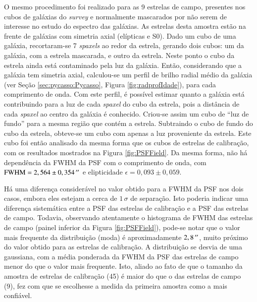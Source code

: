 O mesmo procedimento foi realizado para as 9 estrelas de campo, presentes nos
cubos de galáxias do {\em survey} e normalmente mascarados por não serem de
interesse no estudo do espectro das galáxias. As estrelas desta amostra estão na
frente de galáxias com simetria axial (elípticas e S0). Dado um cubo de uma
galáxia, recortaram-se 7 {\em spaxels} ao redor da estrela, gerando dois cubos:
um da galáxia, com a estrela mascarada, e outro da estrela. Neste ponto o cubo da
estrela ainda está contaminado pela luz da galáxia. Então, considerando que a
galáxia tem simetria axial, calculou-se um perfil de brilho radial médio da
galáxia (ver Seção \ref{sec:pycasso:Pycasso}, Figura \ref{fig:radprofIdade}),
para cada comprimento de onda. Com este perfil, é possível estimar quanto a
galáxia está contribuindo para a luz de cada {\em spaxel} do cubo da estrela,
pois a distância de cada {\em spaxel} ao centro da galáxia é conhecido. Criou-se
assim um cubo de ``luz de fundo'' para a mesma região que contém a estrela.
Subtraindo o cubo de fundo do cubo da estrela, obteve-se um cubo com apenas a
luz proveniente da estrela. Este cubo foi então analisado da mesma forma que os
cubos de estrelas de calibração, com os resultados mostrados na Figura
\ref{fig:PSFField}. Da mesma forma, não há dependência da FWHM da PSF com o
comprimento de onda, com $\mathrm{FWHM}=2,564 \pm 0,354\,^{\prime\prime}$ e elipticidade
$\epsilon=0,093 \pm 0,059$.


Há uma diferença considerável no valor obtido para a FWHM da PSF nos dois casos,
embora eles estejam a cerca de $1\,\sigma$ de separação. Isto poderia indicar
uma diferença sistemática entre a PSF das estrelas de calibração e a PSF das
estrelas de campo. Todavia, observando atentamente o histograma de FWHM das
estrelas de campo (painel inferior da Figura \ref{fig:PSFField}), pode-se notar
que o valor mais frequente da distribuição (moda) é aproximadamente
$2,8\,^{\prime\prime}$, muito próximo do valor obtido para as estrelas de calibração. A
distribuição se desvia de uma gaussiana, com a média ponderada da FWHM da PSF
das estrelas de campo menor do que o valor mais frequente. Isto, aliado ao fato
de que o tamanho da amostra de estrelas de calibração (45) é maior do que o das
estrelas de campo (9), fez com que se escolhesse a medida da primeira amostra
como a mais confiável.

